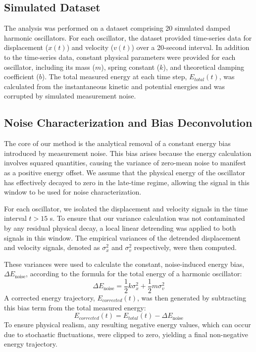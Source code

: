 \documentclass[]{article}
\begin{document}
\subsection{Simulated Dataset}
The analysis was performed on a dataset comprising 20 simulated damped harmonic oscillators. For each oscillator, the dataset provided time-series data for displacement ($x(t)$) and velocity ($v(t)$) over a 20-second interval. In addition to the time-series data, constant physical parameters were provided for each oscillator, including its mass ($m$), spring constant ($k$), and theoretical damping coefficient ($b$). The total measured energy at each time step, $E_{total}(t)$, was calculated from the instantaneous kinetic and potential energies and was corrupted by simulated measurement noise.

\subsection{Noise Characterization and Bias Deconvolution}
The core of our method is the analytical removal of a constant energy bias introduced by measurement noise. This bias arises because the energy calculation involves squared quantities, causing the variance of zero-mean noise to manifest as a positive energy offset. We assume that the physical energy of the oscillator has effectively decayed to zero in the late-time regime, allowing the signal in this window to be used for noise characterization.

For each oscillator, we isolated the displacement and velocity signals in the time interval $t > 15$ s. To ensure that our variance calculation was not contaminated by any residual physical decay, a local linear detrending was applied to both signals in this window. The empirical variances of the detrended displacement and velocity signals, denoted as $\sigma_x^2$ and $\sigma_v^2$ respectively, were then computed.

These variances were used to calculate the constant, noise-induced energy bias, $\Delta E_{\text{noise}}$, according to the formula for the total energy of a harmonic oscillator:
\begin{equation}
\Delta E_{\text{noise}} = \frac{1}{2} k \sigma_x^2 + \frac{1}{2} m \sigma_v^2
\end{equation}
A corrected energy trajectory, $E_{corrected}(t)$, was then generated by subtracting this bias term from the total measured energy:
\begin{equation}
E_{corrected}(t) = E_{total}(t) - \Delta E_{\text{noise}}
\end{equation}
To ensure physical realism, any resulting negative energy values, which can occur due to stochastic fluctuations, were clipped to zero, yielding a final non-negative energy trajectory.
\end{document}
